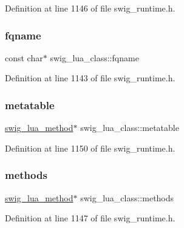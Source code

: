 Definition at line 1146 of file swig\+\_\+runtime.\+h.

\mbox{\label{structswig__lua__class_a3c6469ebd6d312208ff380f8e8eff165}} 
\subsubsection{\texorpdfstring{fqname}{fqname}}
{\footnotesize\ttfamily const char$\ast$ swig\+\_\+lua\+\_\+class\+::fqname}



Definition at line 1143 of file swig\+\_\+runtime.\+h.

\mbox{\label{structswig__lua__class_a7c56e45895444992b6a42c60ba6a17e5}} 
\subsubsection{\texorpdfstring{metatable}{metatable}}
{\footnotesize\ttfamily \mbox{\hyperlink{swig__runtime_8h_a89958881f4c9d723a197b20ac42f6946}{swig\+\_\+lua\+\_\+method}}$\ast$ swig\+\_\+lua\+\_\+class\+::metatable}



Definition at line 1150 of file swig\+\_\+runtime.\+h.

\mbox{\label{structswig__lua__class_ae0d9f30a8114623b1185b5907fc60719}} 
\subsubsection{\texorpdfstring{methods}{methods}}
{\footnotesize\ttfamily \mbox{\hyperlink{swig__runtime_8h_a89958881f4c9d723a197b20ac42f6946}{swig\+\_\+lua\+\_\+method}}$\ast$ swig\+\_\+lua\+\_\+class\+::methods}



Definition at line 1147 of file swig\+\_\+runtime.\+h.

\mbox{\label{structswig__lua__class_abefc5d1a37e06e1c9305d3456a59f2d0}} 
